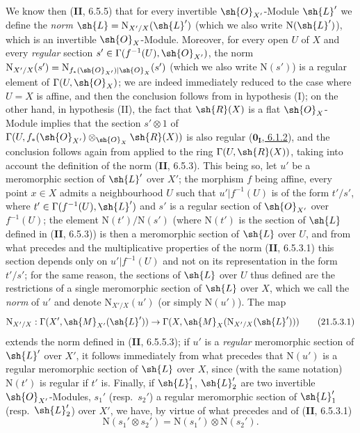 \begin{env}[21.5.3]
We know then (\textbf{II}, 6.5.5) that for every invertible $\sh{O}_{X'}$-Module $\sh{L}'$ we define the \emph{norm} $\sh{L}=\mathrm{N}_{X'/X}(\sh{L}')$ (which we also write $\mathrm{N}(\sh{L}')$), which is an invertible $\sh{O}_X$-Module.
Moreover, for every open $U$ of $X$ and every \emph{regular} section $s'\in\Gamma(f^{-1}(U),\sh{O}_{X'})$, the norm $\mathrm{N}_{X'/X}(s')=\mathrm{N}_{f_*(\sh{O}_{X'})|\sh{O}_X}(s')$ (which we also write $\mathrm{N}(s')$) is a regular element of $\Gamma(U,\sh{O}_X)$;
we are indeed immediately reduced to the case where $U=X$ is affine, and then the conclusion follows from  in hypothesis (I);
on the other hand, in hypothesis (II), the fact that $\sh{R}(X)$ is a flat $\sh{O}_X$-Module implies that the section $s'\otimes 1$ of $\Gamma(U,f_*(\sh{O}_{X'})\otimes_{\sh{O}_X}\sh{R}(X))$ is also regular (\hyperref[0.6.1.2]{$\mathbf{0_I}$, 6.1.2}), and the conclusion follows again from  applied to the ring $\Gamma(U,\sh{R}(X))$, taking into account the definition of the norm (\textbf{II}, 6.5.3).
This being so, let $u'$ be a meromorphic section of $\sh{L}'$ over $X'$;
the morphism $f$ being affine, every point $x\in X$ admits a neighbourhood $U$ such that $u'|f^{-1}(U)$ is of the form $t'/s'$, where $t'\in\Gamma(f^{-1}(U),\sh{L}')$ and $s'$ is a regular section of $\sh{O}_{X'}$ over $f^{-1}(U)$;
the element $\mathrm{N}(t')/\mathrm{N}(s')$ (where $\mathrm{N}(t')$ is the section of $\sh{L}$ defined in (\textbf{II}, 6.5.3)) is then a meromorphic section of $\sh{L}$ over $U$, and from what precedes and the multiplicative properties of the norm (\textbf{II}, 6.5.3.1) this section depends only on $u'|f^{-1}(U)$ and not on its representation in the form $t'/s'$;
for the same reason, the sections of $\sh{L}$ over $U$ thus defined are the restrictions of a single meromorphic section of $\sh{L}$ over $X$, which we call the \emph{norm} of $u'$ and denote $\mathrm{N}_{X'/X}(u')$ (or simply $\mathrm{N}(u')$).
The map
\[
\label{IV.21.5.3.1}
  \mathrm{N}_{X'/X}:\Gamma(X',\sh{M}_{X'}(\sh{L}'))\to\Gamma(X,\sh{M}_X(\mathrm{N}_{X'/X}(\sh{L}')))
  \tag{21.5.3.1}
\]
extends the norm defined in (\textbf{II}, 6.5.5.3);
if $u'$ is a \emph{regular} meromorphic section of $\sh{L}'$ over $X'$, it follows immediately from what precedes that $\mathrm{N}(u')$ is a regular meromorphic section of $\sh{L}$ over $X$, since (with the same notation) $\mathrm{N}(t')$ is regular if $t'$ is.
Finally, if $\sh{L}_1'$, $\sh{L}_2'$ are two invertible $\sh{O}_{X'}$-Modules, $s_1'$ (resp.\ $s_2'$) a regular meromorphic section of $\sh{L}_1'$ (resp.\ $\sh{L}_2'$) over $X'$, we have, by virtue of what precedes and of (\textbf{II}, 6.5.3.1)
\[
\label{IV.21.5.3.2}
  \mathrm{N}(s_1'\otimes s_2')=\mathrm{N}(s_1')\otimes\mathrm{N}(s_2').
  \tag{21.5.3.2}
\]
\end{env}

